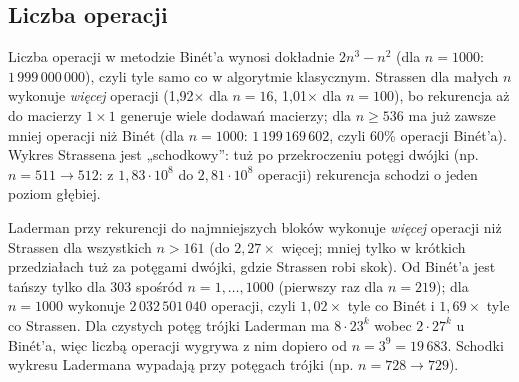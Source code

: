 \documentclass[11pt,a4paper]{article}
\begin{document}
\subsection{Liczba operacji}
Liczba operacji w metodzie Binét'a wynosi dokładnie $2n^3-n^2$ (dla $n=1000$:
$1\,999\,000\,000$), czyli tyle samo co w algorytmie klasycznym. Strassen dla małych $n$ wykonuje \emph{więcej}
operacji (1,92$\times$ dla $n=16$, 1,01$\times$ dla $n=100$), bo rekurencja aż do macierzy $1\times1$ generuje
wiele dodawań macierzy; dla $n\ge 536$ ma już zawsze mniej operacji niż Binét (dla $n=1000$: $1\,199\,169\,602$,
czyli 60\% operacji Binét'a). Wykres Strassena jest „schodkowy'': tuż po przekroczeniu potęgi dwójki
(np. $n=511\to512$: z $1{,}83\cdot10^{8}$ do $2{,}81\cdot10^{8}$ operacji) rekurencja schodzi o jeden poziom głębiej.

Laderman przy rekurencji do najmniejszych bloków wykonuje \emph{więcej} operacji niż Strassen dla wszystkich
$n>161$ (do $2{,}27\times$ więcej; mniej tylko w krótkich przedziałach tuż za potęgami dwójki, gdzie Strassen
robi skok). Od Binét'a jest tańszy tylko dla 303 spośród $n=1,\dots,1000$ (pierwszy raz dla $n=219$); dla $n=1000$
wykonuje $2\,032\,501\,040$ operacji, czyli $1{,}02\times$ tyle co Binét i $1{,}69\times$ tyle co Strassen.
Dla czystych potęg trójki Laderman ma $8\cdot23^k$ wobec $2\cdot27^k$ u Binét'a, więc liczbą operacji wygrywa
z nim dopiero od $n=3^9=19\,683$. Schodki wykresu Ladermana wypadają przy potęgach trójki
(np. $n=728\to729$).
\end{document}
